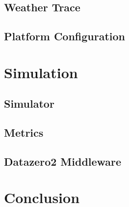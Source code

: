\subsection{Weather Trace}

\subsection{Platform Configuration}

\section{Simulation}

\subsection{Simulator}

\subsection{Metrics}

\subsection{Datazero2 Middleware}

\section{Conclusion}